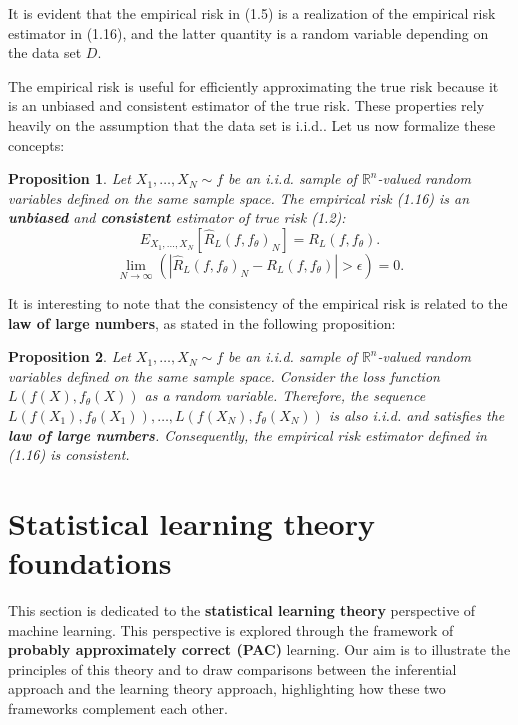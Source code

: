 \documentclass{report}
\newtheorem{proposition}{Proposition}[chapter]
\begin{document}
It is evident that the empirical risk in (1.5) is a realization of the empirical risk estimator in (1.16), and the latter quantity is a random variable depending on the data set $D$.

The empirical risk is useful for efficiently approximating the true risk because it is an unbiased and consistent estimator of the true risk. These properties rely heavily on the assumption that the data set is i.i.d.. Let us now formalize these concepts:

\begin{proposition}
Let $X_1,\dots,X_N \sim f$ be an i.i.d. sample of $\mathbb{R}^n$-valued random variables defined on the same sample space. The empirical risk (1.16) is an \textbf{unbiased} and \textbf{consistent} estimator of true risk (1.2):
\begin{equation}
 E_{X_1,...,X_N}[\hat{R}_L(f,f_\theta)_N] = R_L(f,f_\theta).
\end{equation}
\begin{equation}
 \lim_{N\to \infty}(|\hat{R}_L(f,f_\theta)_N-R_L(f,f_\theta)| > \epsilon) = 0.
 \end{equation}
\end{proposition}

It is interesting to note that the consistency of the empirical risk is related to the \textbf{law of large numbers}, as stated in the following proposition:
\begin{proposition}
Let $X_1,\dots,X_N \sim f$ be an i.i.d. sample of $\mathbb{R}^n$-valued random variables defined on the same sample space. Consider the loss function $L(f(X), f_\theta(X))$ as a random variable. Therefore, the sequence $L(f(X_1),f_\theta(X_1)),\dots,L(f(X_N),f_\theta(X_N))$ is also i.i.d. and satisfies the \textbf{law of large numbers}. Consequently, the empirical risk estimator defined in (1.16) is consistent.
\end{proposition}

\section{Statistical learning theory foundations} 
This section is dedicated to the \textbf{statistical learning theory} perspective of machine learning. This perspective is explored through the framework of \textbf{probably approximately correct (PAC)} learning. Our aim is to illustrate the principles of this theory and to draw comparisons between the inferential approach and the learning theory approach, highlighting how these two frameworks complement each other.
\end{document}
